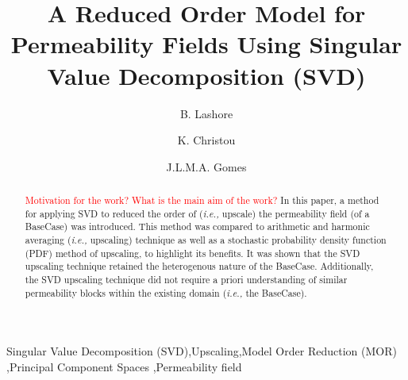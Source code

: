 \documentclass[preprint,12pt]{elsarticle}
\newcommand{\red}{\textcolor{red}}
\newcommand{\ie}{{\it i.e., }}
\begin{document}
\begin{frontmatter}



\title{A Reduced Order Model for Permeability Fields Using Singular Value Decomposition (SVD)}
\author[UoA]{B. Lashore} \author[UoA]{K. Christou} \author[UoA]{J.L.M.A. Gomes} 
\address[UoA]{Mechanics of Fluids, Soils \& Structures Research Group \\ School of Engineering, University of Aberdeen, UK}


\begin{abstract}

\red{Motivation for the work? What is the main aim of the work?} In this paper, a method for applying SVD to reduced the order of (\ie upscale) the permeability field (of a BaseCase) was introduced. This method was compared to arithmetic and harmonic averaging (\ie upscaling) technique as well as a stochastic probability density function (PDF) method of upscaling, to highlight its benefits. It was shown that the SVD upscaling technique retained the heterogenous nature of the BaseCase. Additionally, the SVD upscaling technique did not require a priori understanding of similar permeability blocks within the existing domain (\ie the BaseCase).

\end{abstract}



\begin{keyword} %
Singular Value Decomposition (SVD)\sep Upscaling\sep Model Order Reduction (MOR) \sep  Principal Component Spaces \sep Permeability field
\end{keyword}
 
\end{frontmatter}
\end{document}
